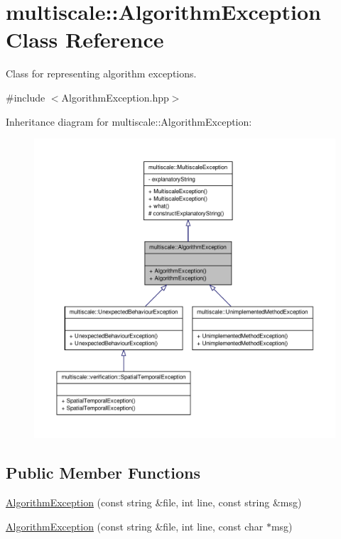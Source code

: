 \hypertarget{classmultiscale_1_1AlgorithmException}{\section{multiscale\-:\-:\-Algorithm\-Exception \-Class \-Reference}
\label{classmultiscale_1_1AlgorithmException}
}


\-Class for representing algorithm exceptions.  




{\ttfamily \#include $<$\-Algorithm\-Exception.\-hpp$>$}



\-Inheritance diagram for multiscale\-:\-:\-Algorithm\-Exception\-:\nopagebreak
\begin{figure}[H]
\begin{center}
\leavevmode
\includegraphics[width=350pt]{classmultiscale_1_1AlgorithmException__inherit__graph}
\end{center}
\end{figure}
\subsection*{\-Public \-Member \-Functions}
\begin{DoxyCompactItemize}
\item 
\hyperlink{classmultiscale_1_1AlgorithmException_a82b64c1819436f13d85f1749c6f0a9a4}{\-Algorithm\-Exception} (const string \&file, int line, const string \&msg)
\item 
\hyperlink{classmultiscale_1_1AlgorithmException_a8e93ad9821b69a6b4ac459f76b3a82ee}{\-Algorithm\-Exception} (const string \&file, int line, const char $\ast$msg)
\end{DoxyCompactItemize}


